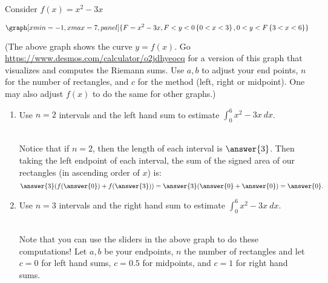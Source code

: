 \documentclass{ximera}
\begin{document}
\begin{question}
Consider $f(x)=x^2-3x$

\begin{onlineOnly}
$$\graph[xmin=-1, xmax=7, panel]{F=x^2-3x, F<y<0\left\{0<x<3\right\},0<y<F\left\{3<x<6\right\}}$$
\end{onlineOnly}
(The above graph shows the curve $y=f(x)$. Go  \url{https://www.desmos.com/calculator/o2jdhyeocq} for a version of this graph that visualizes and computes  the Riemann sums.  Use $a, b$ to adjust your end points, $n$ for the number of rectangles, and $c$ for the method (left, right or midpoint).  One may also adjust $f(x)$ to do the same for other graphs.)


\begin{enumerate}
\item Use $n=2$ intervals and the left hand sum to estimate $\displaystyle\int_0^6 x^2-3x\ dx$. \\ \\
\begin{explanation}
Notice that if $n=2$, then the length of each interval is $\answer{3}$.  Then taking the left endpoint of each interval, the sum of the signed area of our rectangles (in ascending order of $x$) is: $$\answer{3}(f(\answer{0})+f(\answer{3}))=\answer{3}(\answer{0}+\answer{0})=\answer{0}.$$
\end{explanation}




\item Use $n=3$ intervals and the right hand sum to estimate $\displaystyle\int_0^6 x^2-3x\ dx$. \\ \\
 Note that you can use the sliders in the above graph to do these computations!  Let $a,b$ be your endpoints, $n$ the number of rectangles and let $c=0$ for left hand sums, $c=0.5$ for midpoints, and $c=1$ for right hand sums.



\end{enumerate}
\end{question}
\end{document}
